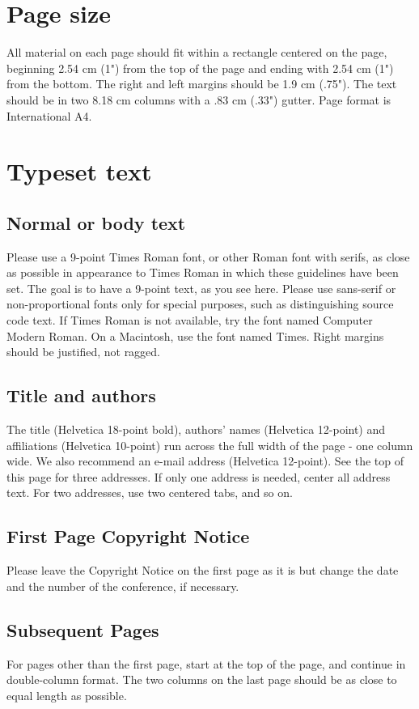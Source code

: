 \documentclass{sig-alternate-br}
\begin{document}
\section{Page size}
All material on each page should fit within a rectangle centered on 
the page, beginning 2.54 cm (1") from the top of the page and ending 
with 2.54 cm (1") from the bottom.  The right and left margins should be 
1.9 cm (.75").  The text should be in two 8.18 cm columns with a .83 cm 
(.33") gutter. Page format is International A4.

\section{Typeset text}
\subsection{Normal or body text}
Please use a 9-point Times Roman font, or other Roman font with 
serifs, as close as possible in appearance to Times Roman in which 
these guidelines have been set. The goal is to have a 9-point text, 
as you see here. Please use sans-serif or non-proportional fonts 
only for special purposes, such as distinguishing source code text. 
If Times Roman is not available, try the font named Computer Modern
Roman. On a Macintosh, use the font named Times. Right margins 
should be justified, not ragged.

\subsection{Title and authors}
The title (Helvetica 18-point bold), authors' names (Helvetica 
12-point) and affiliations (Helvetica 10-point) run across the full 
width of the page - one column wide. We also recommend an  e-mail 
address (Helvetica 12-point). See the top of this page for three 
addresses. If only one address is needed, center all address text. 
For two addresses, use two centered tabs, and so on.

\subsection{First Page Copyright Notice}
Please leave the Copyright Notice on the first page as it is but 
change the date and the number of the conference, if necessary.

\subsection{Subsequent Pages}
For pages other than the first page, start at the top of the page, and 
continue in double-column format.  The two columns on the last page 
should be as close to equal length as possible.
\end{document}
